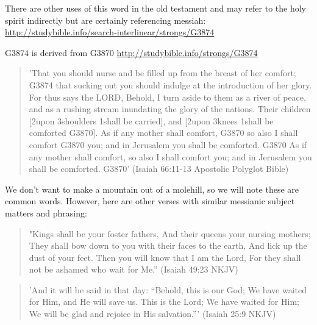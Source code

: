 \documentclass[11pt]{article}
\begin{document}
There are other uses of this word in the old testament and may refer to the holy spirit indirectly but are certainly referencing messiah:
\url{http://studybible.info/search-interlinear/strongs/G3874}

G3874 is derived from G3870
\url{http://studybible.info/strongs/G3874}
\begin{quote}
'That you should nurse and be filled up from the breast of her comfort; G3874 that sucking out you should indulge at the introduction of her glory. For thus says the LORD, Behold, I turn aside to them as a river of peace, and as a rushing stream inundating the glory of the nations. Their children [2upon 3shoulders 1shall be carried], and [2upon 3knees 1shall be comforted G3870]. As if any mother shall comfort, G3870 so also I shall comfort G3870 you; and in Jerusalem you shall be comforted. G3870 As if any mother shall comfort, so also I shall comfort you; and in Jerusalem you shall be comforted. G3870'
(Isaiah 66:11-13 Apostolic Polyglot Bible)
\end{quote}
We don't want to make a mountain out of a molehill, so we will note these are common words. However, here are other verses with similar messianic subject matters and phrasing: 
\begin{quote}
"Kings shall be your foster fathers,
And their queens your nursing mothers;
They shall bow down to you with their faces to the earth,
And lick up the dust of your feet.
Then you will know that I am the Lord,
For they shall not be ashamed who wait for Me.”
(Isaiah 49:23 NKJV)
\end{quote}

\begin{quote}
'And it will be said in that day:
“Behold, this is our God;
We have waited for Him, and He will save us.
This is the Lord;
We have waited for Him;
We will be glad and rejoice in His salvation.”'
(Isaiah 25:9 NKJV)
\end{quote}
\end{document}

